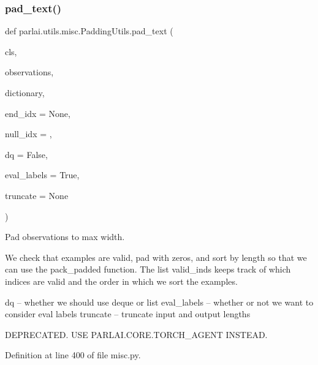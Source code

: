 \mbox{\label{classparlai_1_1utils_1_1misc_1_1PaddingUtils_acd7178452139c55dc56e9889b10347cc}} 
\subsubsection{\texorpdfstring{pad\+\_\+text()}{pad\_text()}}
{\footnotesize\ttfamily def parlai.\+utils.\+misc.\+Padding\+Utils.\+pad\+\_\+text (\begin{DoxyParamCaption}\item[{}]{cls,  }\item[{}]{observations,  }\item[{}]{dictionary,  }\item[{}]{end\+\_\+idx = {\ttfamily None},  }\item[{}]{null\+\_\+idx = {},  }\item[{}]{dq = {\ttfamily False},  }\item[{}]{eval\+\_\+labels = {\ttfamily True},  }\item[{}]{truncate = {\ttfamily None} }\end{DoxyParamCaption})}

\begin{DoxyVerb}Pad observations to max width.

We check that examples are valid, pad with zeros, and sort by length
so that we can use the pack_padded function. The list valid_inds
keeps track of which indices are valid and the order in which we sort
the examples.

dq -- whether we should use deque or list
eval_labels -- whether or not we want to consider eval labels
truncate -- truncate input and output lengths

DEPRECATED. USE PARLAI.CORE.TORCH_AGENT INSTEAD.
\end{DoxyVerb}
 

Definition at line 400 of file misc.\+py.


